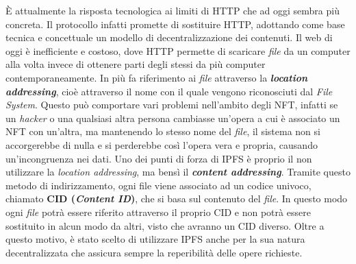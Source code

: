È attualmente la risposta tecnologica ai limiti di HTTP che ad oggi sembra più concreta. Il protocollo infatti promette di sostituire HTTP, adottando come base tecnica e concettuale un modello di decentralizzazione dei contenuti. Il web di oggi è inefficiente e costoso, dove HTTP permette di scaricare \textit{file} da un computer alla volta invece di ottenere parti degli stessi da più computer contemporaneamente. In più fa riferimento ai \textit{file} attraverso la \textbf{\textit{location addressing}}, cioè attraverso il nome con il quale vengono riconosciuti dal \textit{File System}. Questo può comportare vari problemi nell'ambito degli NFT, infatti se un \textit{hacker} o una qualsiasi altra persona cambiasse un'opera a cui è associato un NFT con un'altra, ma mantenendo lo stesso nome del \textit{file}, il sistema non si accorgerebbe di nulla e si perderebbe così l'opera vera e propria, causando un'incongruenza nei dati. 
Uno dei punti di forza di IPFS è proprio il non utilizzare la \textit{location addressing}, ma bensì il \textbf{\textit{content addressing}}. Tramite questo metodo di indirizzamento, ogni file viene associato ad un codice univoco, chiamato \textbf{CID (\textit{Content ID})}, che si basa sul contenuto del \textit{file}. In questo modo ogni \textit{file} potrà essere riferito attraverso il proprio CID e non potrà essere sostituito in alcun modo da altri, visto che avranno un CID diverso.
Oltre a questo motivo, è stato scelto di utilizzare IPFS anche per la sua natura decentralizzata che assicura sempre la reperibilità delle opere richieste. \\




